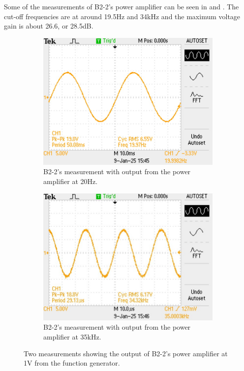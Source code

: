 Some of the measurements of B2-2's power amplifier can be seen in  and . The cut-off frequencies are at around 19.5Hz and 34kHz and the maximum voltage gain is about 26.6, or 28.5dB.
\begin{figure}[H]
\centering

\begin{subfigure}{.5\textwidth}
  \centering
    \includegraphics[width=0.95\linewidth]{TU Delft Booming Bass Project Report/figures/PowerAmplifier/measurements/Afbeelding1.png}
    \captionsetup{justification=raggedright, labelfont=bf}
    \caption{B2-2's measurement with output from the power amplifier at 20Hz.}
    \label{fig:B2-2 20Hz}
\end{subfigure}%
\begin{subfigure}{.5\textwidth}
  \centering
    \includegraphics[width=0.95\linewidth]{TU Delft Booming Bass Project Report/figures/PowerAmplifier/measurements/Afbeelding2.jpg}
    \captionsetup{justification=raggedright, labelfont=bf}
    \caption{B2-2's measurement with output from the power amplifier at 35kHz.}
    \label{fig:B2-2 35kHz}
\end{subfigure}%
\captionsetup{justification=raggedright, labelfont=bf}
\caption{Two measurements showing the output of B2-2's power amplifier at 1V from the function generator.}
\label{B2-2 PA measurements}
\end{figure}

